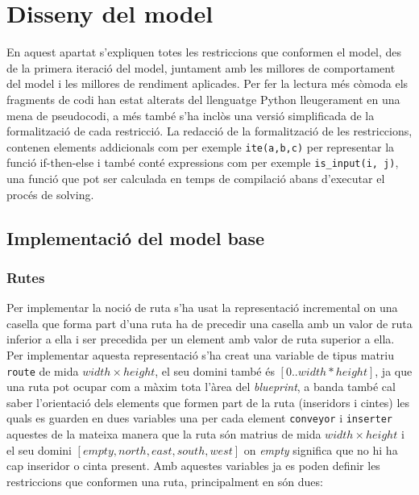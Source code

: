 


\chapter{Disseny del model} \label{disseny model} %

\label{Disseny del model} %
En aquest apartat s'expliquen totes les restriccions que conformen el model, des de la primera iteració del model, juntament amb les millores de comportament del model i les millores de rendiment aplicades. Per fer la lectura més còmoda els fragments de codi han estat alterats del llenguatge Python lleugerament en una mena de pseudocodi, a més també s'ha inclòs una versió simplificada de la formalització de cada restricció. La redacció de la formalització de les restriccions, contenen elements addicionals com per exemple \lstinline{ite(a,b,c)} per representar la funció if-then-else i també conté expressions com per exemple \lstinline{is_input(i, j)}, una funció que pot ser calculada en temps de compilació abans d'executar el procés de solving.


\section{Implementació del model base}\label{model-base}

\subsection{Rutes}
Per implementar la noció de ruta s'ha usat la representació incremental on una casella que forma part d'una ruta ha de precedir una casella amb un valor de ruta inferior a ella i ser precedida per un element amb valor de ruta superior a ella. Per implementar aquesta representació s'ha creat una variable de tipus matriu \lstinline{route} de mida $width \times height$, el seu domini també és $[0..width * height]$, ja que una ruta pot ocupar com a màxim tota l'àrea del \textit{blueprint}, a banda també cal saber l'orientació dels elements que formen part de la ruta (inseridors i cintes) les quals es guarden en dues variables una per cada element \lstinline{conveyor} i \lstinline{inserter} aquestes de la mateixa manera que la ruta són matrius de mida $width \times height$ i el seu domini $[empty, north, east, south, west]$ on \textit{empty} significa que no hi ha cap inseridor o cinta present. Amb aquestes variables ja es poden definir les restriccions que conformen una ruta, principalment en són dues:

